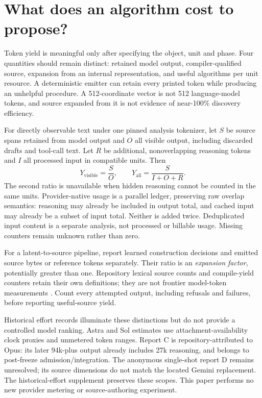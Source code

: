 \section{What does an algorithm cost to propose?}
\label{sec:accounting}

Token yield is meaningful only after specifying the object, unit and phase.
Four quantities should remain distinct: retained model output, compiler-qualified
source, expansion from an internal representation, and useful algorithms per
unit resource. A deterministic emitter can retain every printed token while
producing an unhelpful procedure. A 512-coordinate vector is not 512 language-model
tokens, and source expanded from it is not evidence of near-100\% discovery
efficiency.

For directly observable text under one pinned analysis tokenizer, let $S$ be
source spans retained from model output and $O$ all visible output, including
discarded drafts and tool-call text. Let $R$ be additional, nonoverlapping
reasoning tokens and $I$ all processed input in compatible units. Then
\begin{equation}
 Y_{\mathrm{visible}}=\frac{S}{O},\qquad
 Y_{\mathrm{all}}=\frac{S}{I+O+R}.
\end{equation}
The second ratio is unavailable when hidden reasoning cannot be counted in the
same units. Provider-native usage is a parallel ledger, preserving raw overlap
semantics: reasoning may already be included in output total, and cached input
may already be a subset of input total. Neither is added twice. Deduplicated
input content is a separate analysis, not processed or billable usage. Missing
counters remain unknown rather than zero.

For a latent-to-source pipeline, report learned construction decisions and
emitted source bytes or reference tokens separately. Their ratio is an
\emph{expansion factor}, potentially greater than one. Repository lexical source
counts and compile-yield counters retain their own definitions; they are not
frontier model-token measurements \citep{jope}. Count every attempted output,
including refusals and failures, before reporting useful-source yield.

Historical effort records illuminate these distinctions but do not provide a
controlled model ranking. Astra and Sol estimates use attachment-availability
clock proxies and unmetered token ranges. Report C is repository-attributed to
Opus: its later 94k-plus output already includes 27k reasoning, and belongs to
post-freeze admission/integration. The anonymous single-shot report D remains
unresolved; its source dimensions do not match the located Gemini replacement.
The historical-effort supplement preserves these scopes. This paper performs no new
provider metering or source-authoring experiment.

